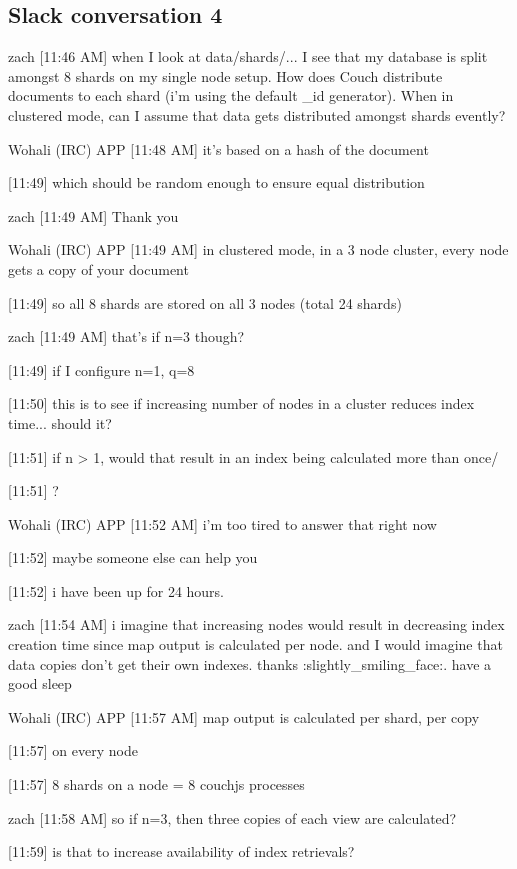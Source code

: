 \subsection{Slack conversation 4}
\label{appendix:slack4}
zach [11:46 AM]
when I look at data/shards/... I see that my database is split amongst 8 shards on my single node setup. How does Couch distribute documents to each shard (i'm using the default _id generator). When in clustered mode, can I assume that data gets distributed amongst shards evently?

Wohali (IRC) APP [11:48 AM]
it's based on a hash of the document

[11:49]
which should be random enough to ensure equal distribution

zach [11:49 AM]
Thank you

Wohali (IRC) APP [11:49 AM]
in clustered mode, in a 3 node cluster, every node gets a copy of your document

[11:49]
so all 8 shards are stored on all 3 nodes (total 24 shards)

zach [11:49 AM]
that's if n=3 though?

[11:49]
if I configure n=1, q=8

    [11:50]
this is to see if increasing number of nodes in a cluster reduces index time... should it?

[11:51]
if n > 1, would that result in an index being calculated more than once/

[11:51]
?

Wohali (IRC) APP [11:52 AM]
i'm too tired to answer that right now

    [11:52]
maybe someone else can help you

    [11:52]
i have been up for 24 hours.

zach [11:54 AM]
i imagine that increasing nodes would result in decreasing index creation time since map output is calculated per node. and I would imagine that data copies don't get their own indexes. thanks :slightly_smiling_face:. have a good sleep

Wohali (IRC) APP [11:57 AM]
map output is calculated per shard, per copy

    [11:57]
on every node

    [11:57]
8 shards on a node = 8 couchjs processes

zach [11:58 AM]
so if n=3, then three copies of each view are calculated?

[11:59]
is that to increase availability of index retrievals?

